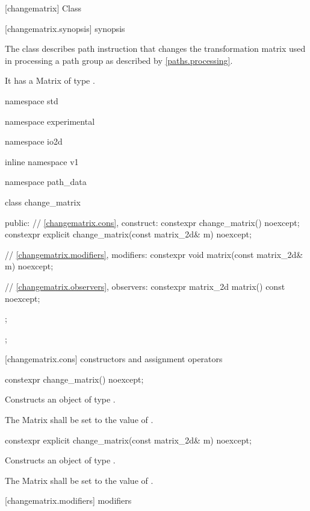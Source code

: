  [changematrix] {Class }

 [changematrix.synopsis] { synopsis}

\pnum
{}
The class  describes path instruction that changes the transformation matrix used in processing a path group as described by \ref{paths.processing}.

\pnum
It has a Matrix of type .

\begin{codeblock}
namespace std { namespace experimental { namespace io2d { inline namespace v1 {
  namespace path_data {
    class change_matrix {
    public:
      // \ref{changematrix.cons}, construct:
      constexpr change_matrix() noexcept;
      constexpr explicit change_matrix(const matrix_2d& m) noexcept;

      // \ref{changematrix.modifiers}, modifiers:
      constexpr void matrix(const matrix_2d& m) noexcept;

      // \ref{changematrix.observers}, observers:
      constexpr matrix_2d matrix() const noexcept;
    };
  };
} } } }
\end{codeblock}

 [changematrix.cons] { constructors and assignment operators}

\begin{itemdecl}
constexpr change_matrix() noexcept;
\end{itemdecl}
\begin{itemdescr}
\pnum
\effects
Constructs an object of type .

\pnum
The Matrix shall be set to the value of .
\end{itemdescr}

\begin{itemdecl}
constexpr explicit change_matrix(const matrix_2d& m) noexcept;
\end{itemdecl}
\begin{itemdescr}
\pnum
\effects
Constructs an object of type .

\pnum
The Matrix shall be set to the value of .
\end{itemdescr}

 [changematrix.modifiers]{ modifiers}

